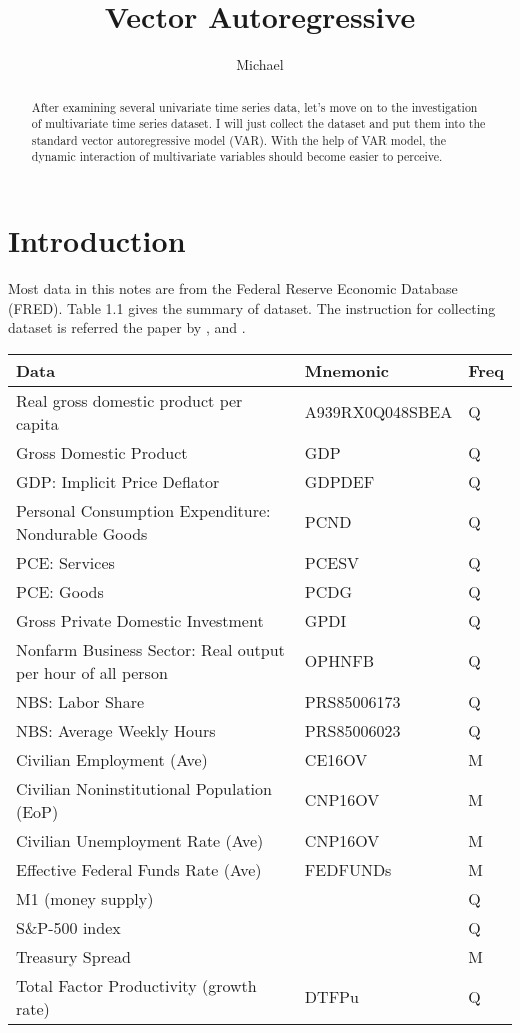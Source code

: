 \documentclass[12pt]{article}
\theoremstyle{definition}
\numberwithin{equation}{section}
\numberwithin{figure}{section}
\numberwithin{table}{section}
\begin{document}
\title{Vector Autoregressive}
\author{Michael}
\date{}
\maketitle

\begin{abstract}
  After examining several univariate time series data, let's move on to the investigation of multivariate time series dataset. I will just collect the dataset and put them into the standard vector autoregressive model (VAR). With the help of VAR model, the dynamic interaction of multivariate variables should become easier to perceive.
\end{abstract}


\section{Introduction}

Most data in this notes are from the Federal Reserve Economic Database (FRED). Table 1.1 gives the summary of dataset. The instruction for collecting dataset is referred the paper by \cite{angeletos2018business}, \cite{gilchrist2012credit} and \cite{doan1984forecasting}.
{\footnotesize
\begin{table}[H]
  \centering
  \begin{tabular}{lll}
    \hline
    Data & Mnemonic & Freq  \\
    \hline
    Real gross domestic product per capita & A939RX0Q048SBEA & Q  \\
    Gross Domestic Product & GDP & Q \\
    GDP: Implicit Price Deflator & GDPDEF & Q \\
    Personal Consumption Expenditure: Nondurable Goods & PCND & Q \\
    PCE: Services & PCESV & Q\\
    PCE: Goods & PCDG & Q \\
    Gross Private Domestic Investment & GPDI &  Q \\
    Nonfarm Business Sector: Real output per hour of all person & OPHNFB & Q \\
    NBS: Labor Share & PRS85006173 & Q \\
    NBS: Average Weekly Hours & PRS85006023 & Q \\
    Civilian Employment (Ave) & CE16OV & M  \\
    Civilian Noninstitutional Population (EoP) & CNP16OV & M  \\
    Civilian Unemployment Rate (Ave)& CNP16OV & M \\
    Effective Federal Funds Rate (Ave) & FEDFUNDs & M  \\
    M1 (money supply) & &Q \\
    S\&P-500 index & & Q \\
    Treasury Spread & & M \\
    Total Factor Productivity (growth rate) & DTFPu & Q \\
    \hline
  \end{tabular}
\end{table}
}
\end{document}
